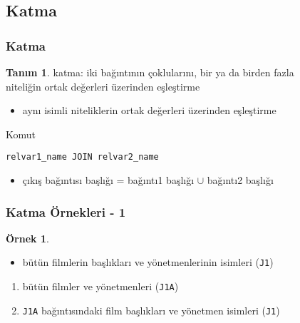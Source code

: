 \documentclass[dvipsnames]{beamer}
\theoremstyle{definition}
\newtheorem{tanim}[theorem]{Tanım}
\theoremstyle{example}
\newtheorem{ornek}[theorem]{Örnek}
\theoremstyle{plain}
\begin{document}
\subsection{Katma}

\begin{frame}[fragile]
  \frametitle{Katma}

  \begin{tanim}
    \alert{katma}: iki bağıntının çoklularını, bir ya da birden fazla\\
      niteliğin ortak değerleri üzerinden eşleştirme

    \begin{itemize}
      \item aynı isimli niteliklerin ortak değerleri üzerinden eşleştirme
    \end{itemize}
  \end{tanim}

  \pause
  \begin{block}{Komut}
    \begin{lstlisting}
relvar1_name JOIN relvar2_name
    \end{lstlisting}
  \end{block}

  \pause
  \begin{itemize}
    \item çıkış bağıntısı başlığı = bağıntı1 başlığı $\cup$ bağıntı2 başlığı
  \end{itemize}
\end{frame}

\begin{frame}
  \frametitle{Katma Örnekleri - 1}

  \begin{ornek}
    \begin{itemize}
      \item bütün filmlerin başlıkları ve yönetmenlerinin isimleri (\texttt{J1})
    \end{itemize}

    \pause
    \begin{enumerate}
      \item bütün filmler ve yönetmenleri (\texttt{J1A})

      \pause
      \item \texttt{J1A} bağıntısındaki film başlıkları ve yönetmen isimleri
         (\texttt{J1})
    \end{enumerate}
  \end{ornek}
\end{frame}
\end{document}
